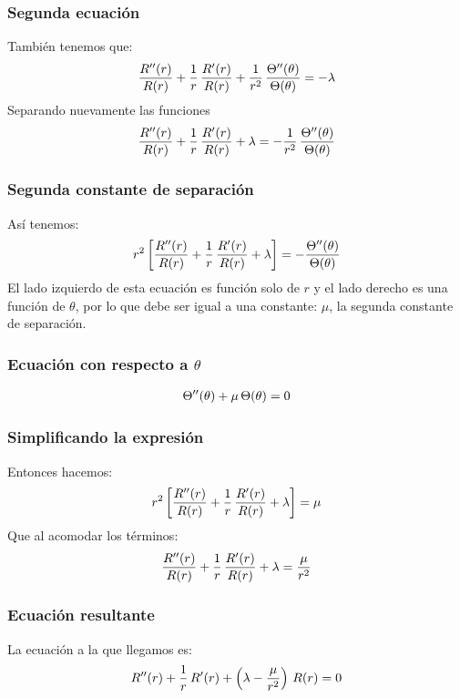 \documentclass[12pt]{beamer}
\begin{document}
\begin{frame}
\frametitle{Segunda ecuación}
También tenemos que:
\begin{align*}
\dfrac{{R}^{\prime \prime} (r)}{R (r)} + \dfrac{1}{r} \, \dfrac{{R}^{\prime} (r)}{R (r)} + \dfrac{1}{r^{2}} \, \dfrac{{\Theta}^{\prime \prime} (\theta)}{\Theta (\theta)} = - \lambda
\end{align*}
\pause
Separando nuevamente las funciones
\begin{align*}
\dfrac{{R}^{\prime \prime} (r)}{R (r)} + \dfrac{1}{r} \, \dfrac{{R}^{\prime} (r)}{R (r)} + \lambda = - \dfrac{1}{r^{2}} \, \dfrac{{\Theta}^{\prime \prime} (\theta)}{\Theta (\theta)}
\end{align*}
\end{frame}
\begin{frame}
\frametitle{Segunda constante de separación}
Así tenemos:
\begin{align}
r^{2} \left[ \dfrac{{R}^{\prime \prime} (r)}{R (r)} + \dfrac{1}{r} \, \dfrac{{R}^{\prime} (r)}{R (r)} + \lambda \right] = - \dfrac{{\Theta}^{\prime \prime} (\theta)}{\Theta (\theta)}
\label{eq:ecuacion_K03}    
\end{align}
El lado izquierdo de esta ecuación es función solo de $r$ y el lado derecho es una función de $\theta$, por lo que debe ser igual a una constante: $\mu$, la segunda constante de separación.
\end{frame}
\begin{frame}
\frametitle{Ecuación con respecto a $\theta$}
\begin{align}
{\Theta}^{\prime \prime} (\theta) + \mu \, \Theta (\theta) = 0
\label{eq:ecuacion_K04}    
\end{align}
\end{frame}
\begin{frame}
\frametitle{Simplificando la expresión}
Entonces hacemos:
\begin{align*}
r^{2} \left[ \dfrac{{R}^{\prime \prime} (r)}{R (r)} + \dfrac{1}{r} \, \dfrac{{R}^{\prime} (r)}{R (r)} + \lambda \right] = \mu
\end{align*}
\pause
Que al acomodar los términos:
\begin{align*}
\dfrac{{R}^{\prime \prime} (r)}{R (r)} + \dfrac{1}{r} \, \dfrac{{R}^{\prime} (r)}{R (r)} + \lambda = \dfrac{\mu}{r^{2}}
\end{align*}
\end{frame}
\begin{frame}
\frametitle{Ecuación resultante}
La ecuación a la que llegamos es:
\begin{align}
{R}^{\prime \prime} (r) + \dfrac{1}{r} \, {R}^{\prime} (r) + \left( \lambda - \dfrac{\mu}{r^{2}} \right) \, R(r) = 0
\label{eq:ecuacion_K05}    
\end{align}
\end{frame}
\end{document}
